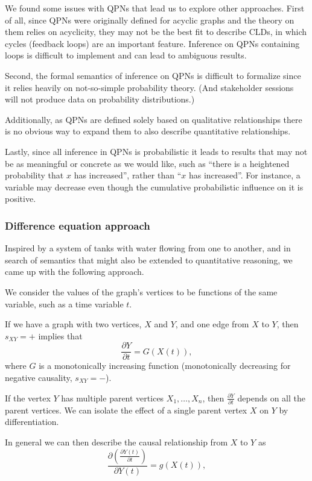 \documentclass[]{article}
\begin{document}
We found some issues with QPNs that lead us to explore other
approaches.
%
First of all, since QPNs were originally defined for acyclic graphs
and the theory on them relies on acyclicity, they may not be the best
fit to describe CLDs, in which cycles (feedback loops) are an important
feature.
%
Inference on QPNs containing loops is difficult to implement and can
lead to ambiguous results.

Second, the formal semantics of inference on QPNs is difficult to
formalize since it relies heavily on not-so-simple probability theory.
%
(And stakeholder sessions will not produce data on probability
distributions.)

Additionally, as QPNs are defined solely based on qualitative
relationships there is no obvious way to expand them to also describe
quantitative relationships.

Lastly, since all inference in QPNs is probabilistic it leads to
results that may not be as meaningful or concrete as we would like,
such as ``there is a heightened probability that $x$ has increased'',
rather than ``$x$ has increased''.
%
For instance, a variable may decrease even though the cumulative
probabilistic influence on it is positive.

\subsubsection{Difference equation approach}

Inspired by a system of tanks with water flowing from one to another,
and in search of semantics that might also be extended to quantitative
reasoning, we came up with the following approach.

We consider the values of the graph's vertices to be functions of the same
variable, such as a time variable $t$.

If we have a graph with two vertices, $X$ and $Y$, and one edge from $X$
to $Y$, then $s_{XY}=+$ implies that
\[\frac{\partial Y}{\partial t} = G(X(t)),\]
where $G$ is a monotonically increasing function (monotonically decreasing for negative
causality, $s_{XY}=-$).

If the vertex $Y$ has multiple parent vertices $X_1,\ldots,X_n$, then
$\frac{\partial Y}{\partial t}$ depends on all the parent vertices. We can
isolate the effect of a single parent vertex
 $X$ on $Y$ by differentiation.

In general we can then describe the causal relationship from $X$ to
$Y$ as
\[\frac{\partial\left( \frac{\partial Y(t)}{\partial t} \right)}{\partial Y(t)} =
  g(X(t)),\]
\end{document}
